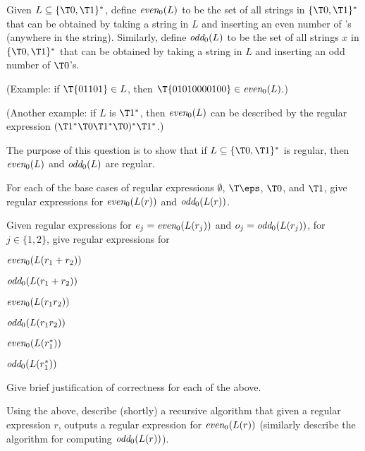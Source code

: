 \begin{questions}[start=7]
{       Given $L\subseteq\{\T0,\T1\}^*$, define $\textit{even}_0(L)$ to be the
       set of all strings in $\{\T0,\T1\}^*$ that can be obtained by
       taking a string in $L$ and inserting an even number of 's
       (anywhere in the string).  Similarly, define $\textit{odd}_0(L)$ to be
       the set of all strings $x$ in $\{\T0,\T1\}^*$ that can be
       obtained by taking a string in $L$ and inserting an odd number
       of $\T0$'s.
       
       
       (Example: if $\T{01101}\in L$, then
       $\T{01010000100}\in\EVEN(L)$.)
       
       (Another example: if $L$ is $\T1^*$, then $\textit{even}_0(L)$ can be
       described by the regular expression
       $(\T1^*\T0\T1^*\T0)^*\T1^*$.)
       
       The purpose of this question is to show that if
       $L\subseteq\{\T0,\T1\}^*$ is regular, then $\textit{even}_0(L)$ and
       $\textit{odd}_0(L)$ are regular.
       
       \begin{questions}
           \item {} %
           For each of the base cases of regular expressions
           $\emptyset$, $\T\eps$, $\T0$, and $\T1$, give regular
           expressions for $\textit{even}_0(L(r))$ and $\textit{odd}_0(L(r))$.

           \item {} %
           Given regular expressions for $e_j=\textit{even}_0(L(r_j))$ and
           $o_j=\textit{odd}_0(L(r_j))$, for $j\in\{1,2\}$, give regular
           expressions for
           \begin{compactenumi}[labelwidth=0.4cm,%
               itemsep=-0.1cm,%
               itemindent=0.4cm,align=parleft]
               \item $\textit{even}_0(L(r_1+r_2))$
               \item $\textit{odd}_0(L(r_1+r_2))$
               \item $\textit{even}_0(L(r_1r_2))$
               \item $\textit{odd}_0(L(r_1r_2))$
               \item $\textit{even}_0(L(r_1^*))$
               \item $\textit{odd}_0(L(r_1^*))$
           \end{compactenumi}
           Give brief justification of correctness for each of the
           above.

           \item {} %
           Using the above, describe (shortly) a recursive algorithm
           that given a regular expression $r$, outputs a regular
           expression for $\textit{even}_0(L(r))$ (similarly describe the
           algorithm for computing $\textit{odd}_0(L(r))$).
       \end{questions}
    }{}{}{}
    

\end{questions}
